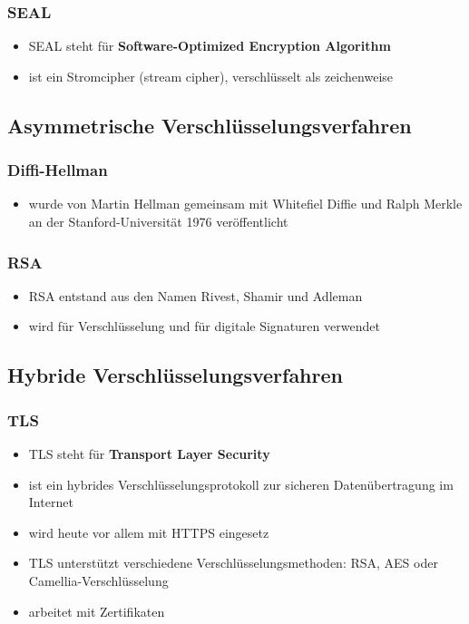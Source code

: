 \subsubsection{SEAL}

\begin{itemize}
\item SEAL steht für \textbf{Software-Optimized Encryption Algorithm}
\item ist ein Stromcipher (stream cipher), verschlüsselt als zeichenweise
\end{itemize}

\subsection{Asymmetrische Verschlüsselungsverfahren}

\subsubsection{Diffi-Hellman}

\begin{itemize}
\item wurde von Martin Hellman gemeinsam mit Whitefiel Diffie und Ralph Merkle an der Stanford-Universität 1976 veröffentlicht
\end{itemize}

\subsubsection{RSA}

\begin{itemize}
\item RSA entstand aus den Namen Rivest, Shamir und Adleman
\item wird für Verschlüsselung und für digitale Signaturen verwendet
\end{itemize}

\subsection{Hybride Verschlüsselungsverfahren}

\subsubsection{TLS}

\begin{itemize}
\item TLS steht für \textbf{Transport Layer Security}
\item ist ein hybrides Verschlüsselungsprotokoll zur sicheren Datenübertragung im Internet
\item wird heute vor allem mit HTTPS eingesetz
\item TLS unterstützt verschiedene Verschlüsselungsmethoden: RSA, AES oder Camellia-Verschlüsselung
\item arbeitet mit Zertifikaten
\end{itemize}